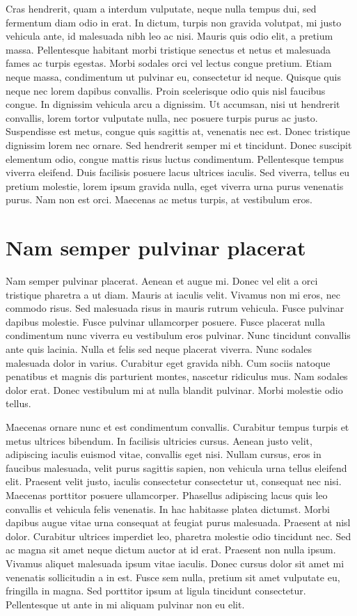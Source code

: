 Cras hendrerit, quam a interdum vulputate, neque nulla tempus dui, sed fermentum diam odio in erat.
In dictum, turpis non gravida volutpat, mi justo vehicula ante, id malesuada nibh leo ac nisi.
Mauris quis odio elit, a pretium massa.
Pellentesque habitant morbi tristique senectus et netus et malesuada fames ac turpis egestas.
Morbi sodales orci vel lectus congue pretium.
Etiam neque massa, condimentum ut pulvinar eu, consectetur id neque.
Quisque quis neque nec lorem dapibus convallis.
Proin scelerisque odio quis nisl faucibus congue.
In dignissim vehicula arcu a dignissim.
Ut accumsan, nisi ut hendrerit convallis, lorem tortor vulputate nulla, nec posuere turpis purus ac justo.
Suspendisse est metus, congue quis sagittis at, venenatis nec est.
Donec tristique dignissim lorem nec ornare.
Sed hendrerit semper mi et tincidunt.
Donec suscipit elementum odio, congue mattis risus luctus condimentum.
Pellentesque tempus viverra eleifend.
Duis facilisis posuere lacus ultrices iaculis.
Sed viverra, tellus eu pretium molestie, lorem ipsum gravida nulla, eget viverra urna purus venenatis purus.
Nam non est orci.
Maecenas ac metus turpis, at vestibulum eros.

\section{Nam semper pulvinar placerat}
Nam semper pulvinar placerat.
Aenean et augue mi.
Donec vel elit a orci tristique pharetra a ut diam.
Mauris at iaculis velit.
Vivamus non mi eros, nec commodo risus.
Sed malesuada risus in mauris rutrum vehicula.
Fusce pulvinar dapibus molestie.
Fusce pulvinar ullamcorper posuere.
Fusce placerat nulla condimentum nunc viverra eu vestibulum eros pulvinar.
Nunc tincidunt convallis ante quis lacinia.
Nulla et felis sed neque placerat viverra.
Nunc sodales malesuada dolor in varius.
Curabitur eget gravida nibh.
Cum sociis natoque penatibus et magnis dis parturient montes, nascetur ridiculus mus.
Nam sodales dolor erat.
Donec vestibulum mi at nulla blandit pulvinar.
Morbi molestie odio tellus.

Maecenas ornare nunc et est condimentum convallis.
Curabitur tempus turpis et metus ultrices bibendum.
In facilisis ultricies cursus.
Aenean justo velit, adipiscing iaculis euismod vitae, convallis eget nisi.
Nullam cursus, eros in faucibus malesuada, velit purus sagittis sapien, non vehicula urna tellus eleifend elit.
Praesent velit justo, iaculis consectetur consectetur ut, consequat nec nisi.
Maecenas porttitor posuere ullamcorper.
Phasellus adipiscing lacus quis leo convallis et vehicula felis venenatis.
In hac habitasse platea dictumst.
Morbi dapibus augue vitae urna consequat at feugiat purus malesuada.
Praesent at nisl dolor.
Curabitur ultrices imperdiet leo, pharetra molestie odio tincidunt nec.
Sed ac magna sit amet neque dictum auctor at id erat.
Praesent non nulla ipsum.
Vivamus aliquet malesuada ipsum vitae iaculis.
Donec cursus dolor sit amet mi venenatis sollicitudin a in est.
Fusce sem nulla, pretium sit amet vulputate eu, fringilla in magna.
Sed porttitor ipsum at ligula tincidunt consectetur.
Pellentesque ut ante in mi aliquam pulvinar non eu elit.

